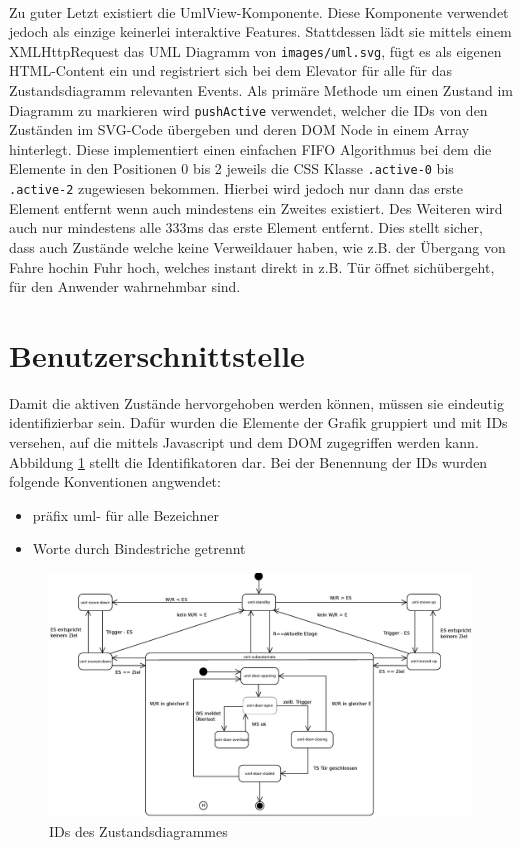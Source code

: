 \paragraph{}
Zu guter Letzt existiert die UmlView-Komponente.
Diese Komponente verwendet jedoch als einzige keinerlei interaktive Features.
Stattdessen lädt sie mittels einem XMLHttpRequest das UML Diagramm von \texttt{images/uml.svg}, fügt es als eigenen HTML-Content ein und registriert sich bei dem Elevator für alle für das Zustandsdiagramm relevanten Events.
Als primäre Methode um einen Zustand im Diagramm zu markieren wird \texttt{pushActive} verwendet, welcher die IDs von den Zuständen im SVG-Code übergeben und deren DOM Node in einem Array hinterlegt.
Diese implementiert einen einfachen FIFO Algorithmus bei dem die Elemente in den Positionen 0 bis 2 jeweils die CSS Klasse \texttt{.active-0} bis \texttt{.active-2} zugewiesen bekommen.
Hierbei wird jedoch nur dann das erste Element entfernt wenn auch mindestens ein Zweites existiert.
Des Weiteren wird auch nur mindestens alle 333ms das erste Element entfernt.
Dies stellt sicher, dass auch Zustände welche keine Verweildauer haben, wie z.B. der Übergang von \glqq Fahre hoch\grqq in \glqq Fuhr hoch\grqq, welches instant direkt in z.B. \glqq Tür öffnet sich\grqq übergeht, für den Anwender wahrnehmbar sind.

\newpage
\section{Benutzerschnittstelle}
Damit die aktiven Zustände hervorgehoben werden können, müssen sie eindeutig identifizierbar sein.
Dafür wurden die Elemente der Grafik gruppiert und mit IDs versehen, auf die mittels Javascript und dem \acrshort{DOM} zugegriffen werden kann.
Abbildung \ref{fig:ZD_id_view} stellt die Identifikatoren dar.
Bei der Benennung der IDs wurden folgende Konventionen angwendet:
\begin{itemize}
	\item präfix uml- für alle Bezeichner
	\item Worte durch Bindestriche getrennt
\end{itemize}

\begin{figure}[hbt]
	\hspace*{-2cm}
	\includegraphics[width=1.3\textwidth]{images/ZDv6_id_view.eps}
	\caption{IDs des Zustandsdiagrammes}
	\label{fig:ZD_id_view}
\end{figure}

